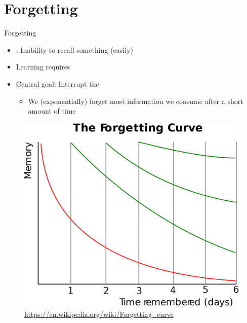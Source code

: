 \documentclass{ercisbeamer}
\begin{document}
\section{Forgetting}
\begin{frame}{Forgetting}
    \begin{itemize}
        \item {}: Inability to recall something (easily)
        \item Learning requires 
        \item Central goal: Interrupt the 
        \begin{itemize}
            \item We (exponentially) forget most information we consume after a short amount of time
        \end{itemize}
    \end{itemize}

    \begin{figure}
        \centering
        \includegraphics[width=0.3\paperwidth]{04_resources/forgetting_curve.png}
        \vspace{-0.5em}
        \caption{\tiny \url{https://en.wikipedia.org/wiki/Forgetting_curve}}
    \end{figure}
\end{frame}
\end{document}
